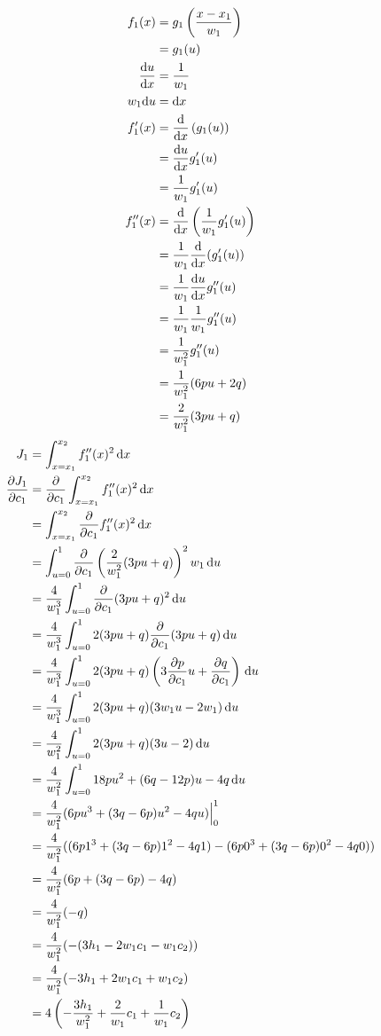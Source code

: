 \documentclass{article}
\begin{document}
\begin{align*}
  f_1(x)
  &= g_1\left(\frac{x-x_1}{w_1}\right) \\
  &= g_1(u) \\
  \frac{\mathrm{d}u}{\mathrm{d}x}
  &= \frac{1}{w_1} \\
  w_1\mathrm{d}u
  &= \mathrm{d}x \\
  f_1'(x)
  &= \frac{\mathrm{d}}{\mathrm{d}x} \left(g_1(u)\right) \\
  &= \frac{\mathrm{d}u}{\mathrm{d}x} g_1'(u) \\
  &= \frac{1}{w_1}g_1'(u) \\
  f_1''(x)
  &= \frac{\mathrm{d}}{\mathrm{d}x} \left(\frac{1}{w_1}g_1'(u)\right) \\
  &= \frac{1}{w_1} \frac{\mathrm{d}}{\mathrm{d}x} (g_1'(u)) \\
  &= \frac{1}{w_1} \frac{\mathrm{d}u}{\mathrm{d}x} g_1''(u) \\
  &= \frac{1}{w_1} \frac{1}{w_1} g_1''(u) \\
  &= \frac{1}{w_1^2} g_1''(u) \\
  &= \frac{1}{w_1^2}(6pu+2q) \\
  &= \frac{2}{w_1^2}(3pu+q)
\end{align*}
\begin{align*}
  J_1
  &= \int_{x=x_1}^{x_2}f_1''(x)^2\, \mathrm{d}x \\
  \frac{\partial J_1}{\partial c_1}
  &= \frac{\partial}{\partial c_1} \int_{x=x_1}^{x_2} f_1''(x)^2 \, \mathrm{d}x \\
  &= \int_{x=x_1}^{x_2} \frac{\partial}{\partial c_1} f_1''(x)^2 \, \mathrm{d}x \\
  &= \int_{u=0}^{1} \frac{\partial}{\partial c_1} \left(\frac{2}{w_1^2}(3pu+q)\right)^2 w_1 \, \mathrm{d}u \\
  &= \frac{4}{w_1^3} \int_{u=0}^{1} \frac{\partial}{\partial c_1} (3pu+q)^2 \, \mathrm{d}u \\
  &= \frac{4}{w_1^3} \int_{u=0}^{1} 2(3pu+q) \frac{\partial}{\partial c_1} (3pu+q) \, \mathrm{d}u \\
  &= \frac{4}{w_1^3} \int_{u=0}^{1} 2(3pu+q) \left(3\frac{\partial p}{\partial c_1}u+\frac{\partial q}{\partial c_1}\right) \, \mathrm{d}u \\
  &= \frac{4}{w_1^3} \int_{u=0}^{1} 2(3pu+q)(3w_1u-2w_1) \, \mathrm{d}u \\
  &= \frac{4}{w_1^2} \int_{u=0}^{1} 2(3pu+q)(3u-2) \, \mathrm{d}u \\
  &= \frac{4}{w_1^2} \int_{u=0}^{1} 18pu^2+(6q-12p)u-4q \, \mathrm{d}u \\
  &= \frac{4}{w_1^2} (6pu^3+(3q-6p)u^2-4qu)\Bigr|_0^1 \\
  &= \frac{4}{w_1^2} ((6p1^3+(3q-6p)1^2-4q1)-(6p0^3+(3q-6p)0^2-4q0)) \\
  &= \frac{4}{w_1^2} (6p+(3q-6p)-4q) \\
  &= \frac{4}{w_1^2} (-q) \\
  &= \frac{4}{w_1^2} (-(3h_1-2w_1c_1-w_1c_2)) \\
  &= \frac{4}{w_1^2} (-3h_1+2w_1c_1+w_1c_2) \\
  &= 4\left(-\frac{3h_1}{w_1^2}+\frac{2}{w_1}c_1+\frac{1}{w_1}c_2\right)
\end{align*}
\end{document}
